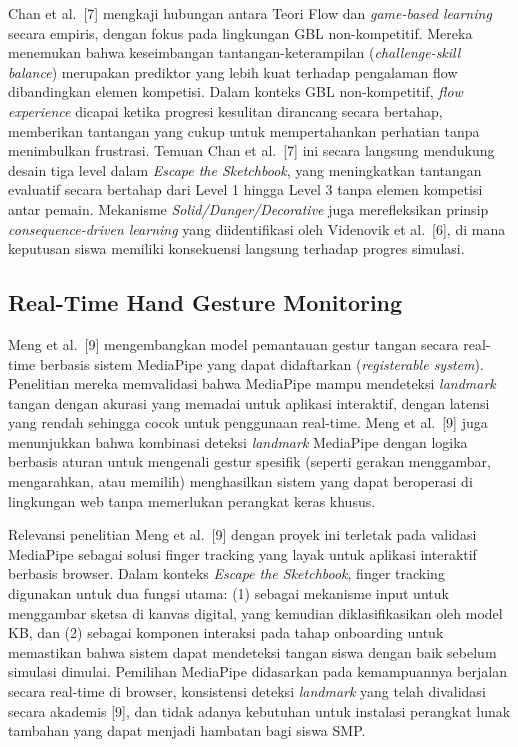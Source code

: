 Chan et al.\ [7] mengkaji hubungan antara Teori Flow dan \textit{game-based learning} secara empiris, dengan fokus pada lingkungan GBL non-kompetitif. Mereka menemukan bahwa keseimbangan tantangan-keterampilan (\textit{challenge-skill balance}) merupakan prediktor yang lebih kuat terhadap pengalaman flow dibandingkan elemen kompetisi. Dalam konteks GBL non-kompetitif, \textit{flow experience} dicapai ketika progresi kesulitan dirancang secara bertahap, memberikan tantangan yang cukup untuk mempertahankan perhatian tanpa menimbulkan frustrasi. Temuan Chan et al.\ [7] ini secara langsung mendukung desain tiga level dalam \textit{Escape the Sketchbook}, yang meningkatkan tantangan evaluatif secara bertahap dari Level 1 hingga Level 3 tanpa elemen kompetisi antar pemain. Mekanisme \textit{Solid/Danger/Decorative} juga merefleksikan prinsip \textit{consequence-driven learning} yang diidentifikasi oleh Videnovik et al.\ [6], di mana keputusan siswa memiliki konsekuensi langsung terhadap progres simulasi.

\subsection{Real-Time Hand Gesture Monitoring}
\label{subsec:penelitian-hand-gesture}

Meng et al.\ [9] mengembangkan model pemantauan gestur tangan secara real-time berbasis sistem MediaPipe yang dapat didaftarkan (\textit{registerable system}). Penelitian mereka memvalidasi bahwa MediaPipe mampu mendeteksi \textit{landmark} tangan dengan akurasi yang memadai untuk aplikasi interaktif, dengan latensi yang rendah sehingga cocok untuk penggunaan real-time. Meng et al.\ [9] juga menunjukkan bahwa kombinasi deteksi \textit{landmark} MediaPipe dengan logika berbasis aturan untuk mengenali gestur spesifik (seperti gerakan menggambar, mengarahkan, atau memilih) menghasilkan sistem yang dapat beroperasi di lingkungan web tanpa memerlukan perangkat keras khusus.

Relevansi penelitian Meng et al.\ [9] dengan proyek ini terletak pada validasi MediaPipe sebagai solusi finger tracking yang layak untuk aplikasi interaktif berbasis browser. Dalam konteks \textit{Escape the Sketchbook}, finger tracking digunakan untuk dua fungsi utama: (1) sebagai mekanisme input untuk menggambar sketsa di kanvas digital, yang kemudian diklasifikasikan oleh model KB, dan (2) sebagai komponen interaksi pada tahap onboarding untuk memastikan bahwa sistem dapat mendeteksi tangan siswa dengan baik sebelum simulasi dimulai. Pemilihan MediaPipe didasarkan pada kemampuannya berjalan secara real-time di browser, konsistensi deteksi \textit{landmark} yang telah divalidasi secara akademis [9], dan tidak adanya kebutuhan untuk instalasi perangkat lunak tambahan yang dapat menjadi hambatan bagi siswa SMP.

